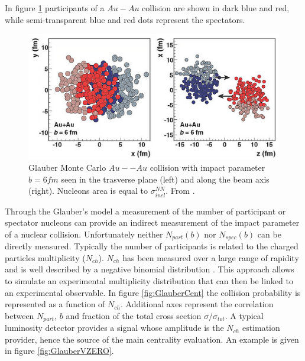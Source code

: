 In figure \ref{fig:GlauberAuAu} participants of a $Au-Au$ collision are shown in dark blue and red, while semi-transparent blue and red dots represent the spectators.

\begin{figure}[!t]
\begin{center}
\includegraphics[width=0.9\linewidth]{Chapters/Analysis/Figs/glauber-pbpb.pdf}
\caption{Glauber Monte Carlo $Au--Au$ collision with impact parameter $b=6 fm$ seen in the trasverse plane (left) and along the beam axis (right). Nucleons area is equal to $\sigma_{inel}^{NN}$. From \cite{Miller:2007ri}.}
\label{fig:GlauberAuAu}
\end{center}
\end{figure}

Through the Glauber's model a measurement of the number of participant or spectator nucleons can provide an indirect measurement of the impact parameter of a nuclear collision.
Unfortunately neither $N_{part}(b)$ nor $N_{spec}(b)$ can be directly measured.
Typically the number of participants is related to the charged particles multiplicity ($N_{ch}$).
$N_{ch}$ has been measured over a large range of rapidity and is well described by a negative binomial distribution \cite{Aamodt:2009aa}.
This approach allows to simulate an experimental multiplicity distribution that can then be linked to an experimental observable.
In figure \ref{fig:GlauberCent} the collision probability is represented as a function of $N_{ch}$. Additional axes represent the correlation between $N_{part}$, $b$ and fraction of the total cross section $\sigma/\sigma_{tot}$.
A typical luminosity detector provides a signal whose amplitude is the $N_{ch}$ estimation provider, hence the source of the main centrality evaluation.
An example is given in figure \ref{fig:GlauberVZERO}.


